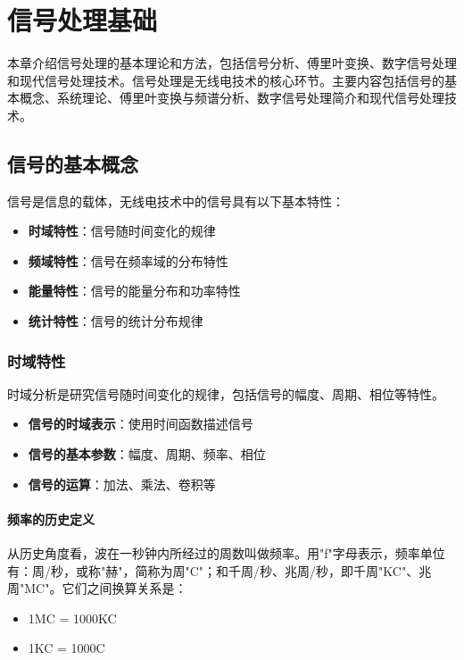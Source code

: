 \documentclass[12pt,UTF8]{ctexbook}
\begin{document}
\chapter{信号处理基础}

本章介绍信号处理的基本理论和方法，包括信号分析、傅里叶变换、数字信号处理和现代信号处理技术。信号处理是无线电技术的核心环节。主要内容包括信号的基本概念、系统理论、傅里叶变换与频谱分析、数字信号处理简介和现代信号处理技术。

\section{信号的基本概念}

信号是信息的载体，无线电技术中的信号具有以下基本特性：

\begin{itemize}[leftmargin=3.5em]
    \item \textbf{时域特性}：信号随时间变化的规律
    \item \textbf{频域特性}：信号在频率域的分布特性
    \item \textbf{能量特性}：信号的能量分布和功率特性
    \item \textbf{统计特性}：信号的统计分布规律
\end{itemize}

\subsection{时域特性}

时域分析是研究信号随时间变化的规律，包括信号的幅度、周期、相位等特性。
\begin{itemize}[leftmargin=3.5em]
    \item \textbf{信号的时域表示}：使用时间函数描述信号
    \item \textbf{信号的基本参数}：幅度、周期、频率、相位
    \item \textbf{信号的运算}：加法、乘法、卷积等
\end{itemize}

\subsubsection{频率的历史定义}

从历史角度看，波在一秒钟内所经过的周数叫做频率。用"f"字母表示，频率单位有：周/秒，或称"赫"，简称为周"C"；和千周/秒、兆周/秒，即千周"KC"、兆周"MC"。它们之间换算关系是：

\begin{itemize}[leftmargin=3.5em]
    \item 1MC = 1000KC
    \item 1KC = 1000C
\end{itemize}
\end{document}
